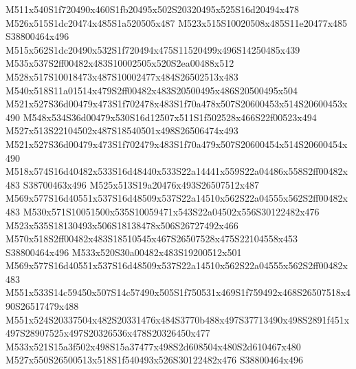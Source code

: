 \documentclass{article}
\begin{document}
\begin{multicols}{2}









M511x540S1f720490x460S1fb20495x502S20320495x525S16d20494x478 M526x515S1dc20474x485S1a520505x487 M523x515S10020508x485S11e20477x485 S38800464x496 M515x562S1dc20490x532S1f720494x475S11520499x496S14250485x439 M535x537S2ff00482x483S10002505x520S2ea00488x512 M528x517S10018473x487S10002477x484S26502513x483 M540x518S11a01514x479S2ff00482x483S20500495x486S20500495x504 M521x527S36d00479x473S1f702478x483S1f70a478x507S20600453x514S20600453x490 M548x534S36d00479x530S16d12507x511S1f502528x466S22f00523x494 M527x513S22104502x487S18540501x498S26506474x493 M521x527S36d00479x473S1f702479x483S1f70a479x507S20600454x514S20600454x490 M518x574S16d40482x533S16d48440x533S22a14441x559S22a04486x558S2ff00482x483 S38700463x496 M525x513S19a20476x493S26507512x487 M569x577S16d40551x537S16d48509x537S22a14510x562S22a04555x562S2ff00482x483 M530x571S10051500x535S10059471x543S22a04502x556S30122482x476 M523x535S18130493x506S18138478x506S26727492x466 M570x518S2ff00482x483S18510545x467S26507528x475S22104558x453 S38800464x496 M533x520S30a00482x483S19200512x501 M569x577S16d40551x537S16d48509x537S22a14510x562S22a04555x562S2ff00482x483 M551x533S14c59450x507S14c57490x505S1f750531x469S1f759492x468S26507518x490S26517479x488 M551x524S20337504x482S20331476x484S3770b488x497S37713490x498S2891f451x497S28907525x497S20326536x478S20326450x477 M533x521S15a3f502x498S15a37477x498S2d608504x480S2d610467x480 M527x550S26500513x518S1f540493x526S30122482x476 S38800464x496


\end{multicols}
\end{document}
